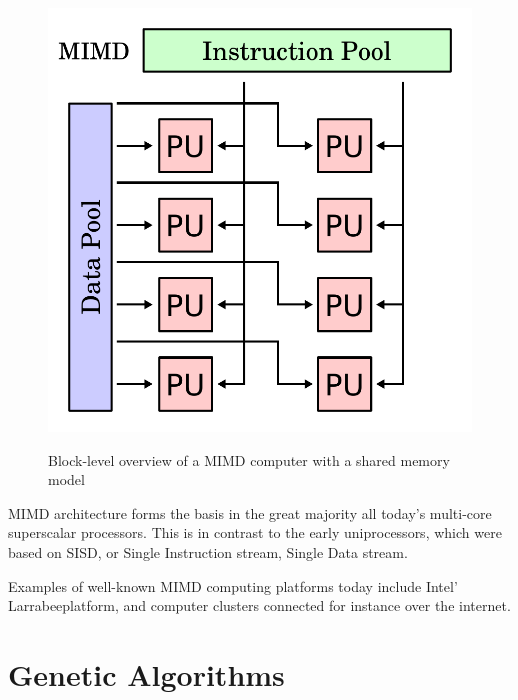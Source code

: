 \begin{figure}[H]
\begin{center}
    \includegraphics[width=\textwidth/2]{fig/mimd-block-diagram.pdf}
    \label{figure:mimd-block-diagram}
    \caption{Block-level overview of a MIMD computer with a shared memory model}
\end{center}
\end{figure}

MIMD architecture forms the basis in the great majority all today’s multi-core superscalar processors.
This is in contrast to the early uniprocessors, which were based on SISD, or Single Instruction stream, Single Data stream. 


Examples of well-known MIMD computing platforms today include Intel' Larrabee\cn platform, and computer clusters connected for instance over the internet.




\section{Genetic Algorithms}

